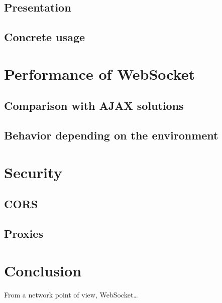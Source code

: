 \documentclass[10pt,journal,compsoc]{IEEEtran}
\newcommand{\ws}{WebSocket}
\begin{document}
\subsection{Presentation}

\subsection{Concrete usage}



\section{Performance of \ws}

\subsection{Comparison with AJAX solutions}

\subsection{Behavior depending on the environment}



\section{Security}

\subsection{CORS}

\subsection{Proxies}



\section{Conclusion}

From a network point of view, \ws …


\ifCLASSOPTIONcaptionsoff
  \newpage
\fi




\end{document}
